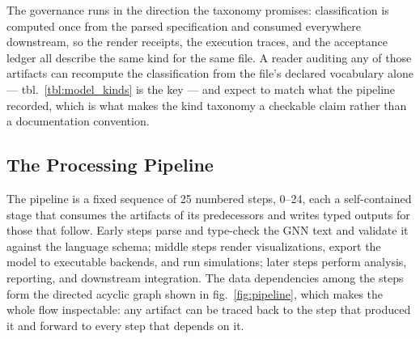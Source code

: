 \documentclass[
  english,
  9pt,
]{extarticle}
\begin{document}
The governance runs in the direction the taxonomy promises:
classification is computed once from the parsed specification and
consumed everywhere downstream, so the render receipts, the execution
traces, and the acceptance ledger all describe the same kind for the
same file. A reader auditing any of those artifacts can recompute the
classification from the file's declared vocabulary alone ---
tbl.~\ref{tbl:model_kinds} is the key --- and expect to match what the
pipeline recorded, which is what makes the kind taxonomy a checkable
claim rather than a documentation convention.

\subsection{The Processing Pipeline}\label{the-processing-pipeline}

The pipeline is a fixed sequence of 25 numbered steps, 0--24, each a
self-contained stage that consumes the artifacts of its predecessors and
writes typed outputs for those that follow. Early steps parse and
type-check the GNN text and validate it against the language schema;
middle steps render visualizations, export the model to executable
backends, and run simulations; later steps perform analysis, reporting,
and downstream integration. The data dependencies among the steps form
the directed acyclic graph shown in fig.~\ref{fig:pipeline}, which makes
the whole flow inspectable: any artifact can be traced back to the step
that produced it and forward to every step that depends on it.
\end{document}
